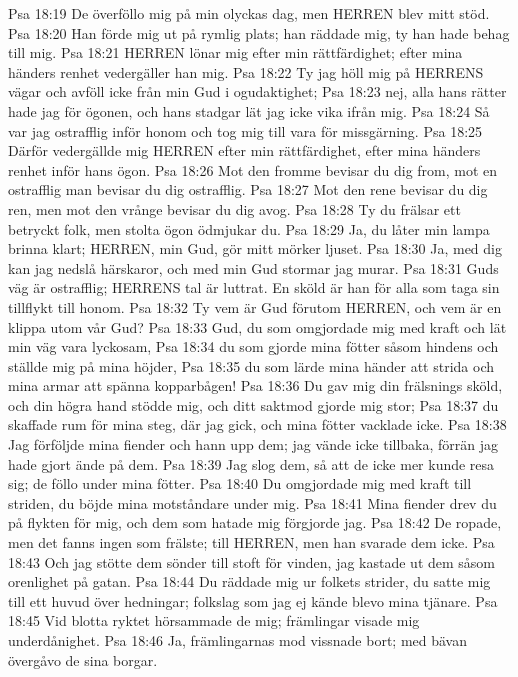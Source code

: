 Psa 18:19  De överföllo mig på min olyckas dag, men HERREN blev mitt stöd.
Psa 18:20  Han förde mig ut på rymlig plats; han räddade mig, ty han hade behag till mig.
Psa 18:21  HERREN lönar mig efter min rättfärdighet; efter mina händers renhet vedergäller han mig.
Psa 18:22  Ty jag höll mig på HERRENS vägar och avföll icke från min Gud i ogudaktighet;
Psa 18:23  nej, alla hans rätter hade jag för ögonen, och hans stadgar lät jag icke vika ifrån mig.
Psa 18:24  Så var jag ostrafflig inför honom och tog mig till vara för missgärning.
Psa 18:25  Därför vedergällde mig HERREN efter min rättfärdighet, efter mina händers renhet inför hans ögon.
Psa 18:26  Mot den fromme bevisar du dig from, mot en ostrafflig man bevisar du dig ostrafflig.
Psa 18:27  Mot den rene bevisar du dig ren, men mot den vrånge bevisar du dig avog.
Psa 18:28  Ty du frälsar ett betryckt folk, men stolta ögon ödmjukar du.
Psa 18:29  Ja, du låter min lampa brinna klart; HERREN, min Gud, gör mitt mörker ljuset.
Psa 18:30  Ja, med dig kan jag nedslå härskaror, och med min Gud stormar jag murar.
Psa 18:31  Guds väg är ostrafflig; HERRENS tal är luttrat. En sköld är han för alla som taga sin tillflykt till honom.
Psa 18:32  Ty vem är Gud förutom HERREN, och vem är en klippa utom vår Gud?
Psa 18:33  Gud, du som omgjordade mig med kraft och lät min väg vara lyckosam,
Psa 18:34  du som gjorde mina fötter såsom hindens och ställde mig på mina höjder,
Psa 18:35  du som lärde mina händer att strida och mina armar att spänna kopparbågen!
Psa 18:36  Du gav mig din frälsnings sköld, och din högra hand stödde mig, och ditt saktmod gjorde mig stor;
Psa 18:37  du skaffade rum för mina steg, där jag gick, och mina fötter vacklade icke.
Psa 18:38  Jag förföljde mina fiender och hann upp dem; jag vände icke tillbaka, förrän jag hade gjort ände på dem.
Psa 18:39  Jag slog dem, så att de icke mer kunde resa sig; de föllo under mina fötter.
Psa 18:40  Du omgjordade mig med kraft till striden, du böjde mina motståndare under mig.
Psa 18:41  Mina fiender drev du på flykten för mig, och dem som hatade mig förgjorde jag.
Psa 18:42  De ropade, men det fanns ingen som frälste; till HERREN, men han svarade dem icke.
Psa 18:43  Och jag stötte dem sönder till stoft för vinden, jag kastade ut dem såsom orenlighet på gatan.
Psa 18:44  Du räddade mig ur folkets strider, du satte mig till ett huvud över hedningar; folkslag som jag ej kände blevo mina tjänare.
Psa 18:45  Vid blotta ryktet hörsammade de mig; främlingar visade mig underdånighet.
Psa 18:46  Ja, främlingarnas mod vissnade bort; med bävan övergåvo de sina borgar.

